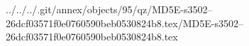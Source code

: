 ../../../.git/annex/objects/95/qz/MD5E-s3502--26dcf03571f0e0760590beb0530824b8.tex/MD5E-s3502--26dcf03571f0e0760590beb0530824b8.tex